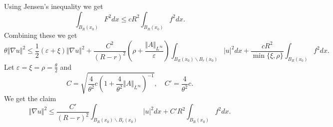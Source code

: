 \documentclass{article}
\begin{document}
Using Jensen's inequality we get
\begin{equation*}
\int_{B_R(x_0)}F^2dx\leq cR^2\int_{B_R(x_0)}f^2dx.
\end{equation*}
Combining these we get
\begin{equation*}
\theta\Vert\nabla u\Vert^2\leq {\frac 1 2}(\varepsilon+\xi)\Vert\nabla u\Vert^2+{\frac {C^2} {(R-r)^2}}(\rho+{\frac {\Vert A\Vert_{L^\infty}} \varepsilon})\int_{B_R(x_0)\backslash B_r(x_0)}|u|^2dx+{\frac {cR^2} {\min\{\xi,\rho\}}}\int_{B_R(x_0)}f^2dx.
\end{equation*}
Let $\varepsilon=\xi=\rho={\frac \theta 2}$ and 
\begin{equation*}
C = \sqrt{{\frac 4 {\theta^2}}c(1+{\frac 4 {\theta^2}}\Vert A\Vert_{L^\infty})^{-1}},\quad C' = {\frac 4 {\theta^2}}c.
\end{equation*}
We get the claim 
\begin{equation*}
\Vert\nabla u\Vert^2\leq {\frac {C'} {(R-r)^2}}\int_{B_R(x_0)\backslash B_r(x_0)}|u|^2dx+C'R^2\int_{B_R(x_0)}f^2dx.
\end{equation*}
\end{document}
